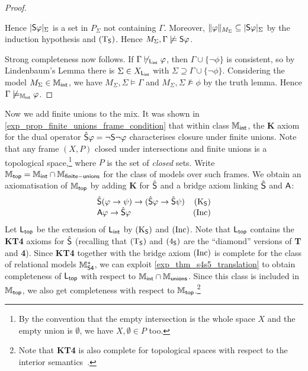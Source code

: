\begin{proof}
\begin{itemize}
    Hence $|\S\phi|_\Sigma$ is a set in $P_\Sigma$ not containing
    $\Gamma$. Moreover, $\|\phi\|_{M_\Sigma} \subseteq
    |\S\phi|_\Sigma$ by the induction hypothesis and $\Tsoundness$.
    Hence $M_\Sigma, \Gamma \not\models \S\phi$.
    \end{itemize}

    Strong completeness now follows. If $\Gamma \not\entails_{\sLint} \phi$, then
    $\Gamma \cup \{\neg\phi\}$ is consistent, so by Lindenbaum's Lemma
    there is $\Sigma \in X_{\sLint}$ with $\Sigma \supseteq \Gamma \cup
    \{\neg\phi\}$.  Considering the model $M_\Sigma \in \Mint$, we have
    $M_\Sigma, \Sigma \models \Gamma$ and $M_\Sigma, \Sigma \not\models
    \phi$ by the truth lemma. Hence $\Gamma \not\models_{\Mint} \phi$.
\end{proof}

Now we add finite unions to the mix. It was shown in
\cref{exp_prop_finite_unions_frame_condition} that within class $\Mint$, the
\textbf{K} axiom for the dual operator $\hat\S\phi = \neg\S\neg\phi$ characterises closure under
finite unions. Note that any frame $(X, P)$ closed under intersections and
finite unions is a topological space,\footnote{By the convention that the empty
intersection is the whole space $X$ and the empty union is $\emptyset$, we have
$X, \emptyset \in P$ too.} where $P$ is the set of \emph{closed} sets. Write
$\Mtop = \Mint \cap \Mfunions$ for the class of models over such frames. We
obtain an axiomatisation of $\Mtop$ by adding \textbf{K} for $\hat\S$ and a
bridge axiom linking $\hat\S$ and $\A$:
\[
    \begin{array}{lr}
        \hat{\S}(\phi \limplies \psi) \limplies (\hat{\S}\phi \limplies \hat{\S}\psi)
            & \Ksoundness \\
        \A\phi \limplies \hat\S\phi
    & \inc
    \end{array}
\]
Let $\sLtop$ be the extension
of $\sLint$ by $\Ksoundness$ and $\inc$. Note that $\sLtop$ contains the
\textbf{KT4} axioms for $\hat\S$ (recalling that $\Tsoundness$ and
$\foursoundness$ are the ``diamond'' versions of \textbf{T} and \textbf{4}).
Since \textbf{KT4} together with the bridge axiom $\inc$ is complete for the
class of relational models $\Msfour$, we can exploit
\cref{exp_thm_s4s5_translation} to obtain completeness of $\sLtop$ with respect to
$\Mint \cap \Munions$. Since this class is included in $\Mtop$, we also get
completeness with respect to $\Mtop$.\footnote{Note that \textbf{KT4} is also
complete for topological spaces with respect to the interior
semantics~\cite{van2007modal}.}

